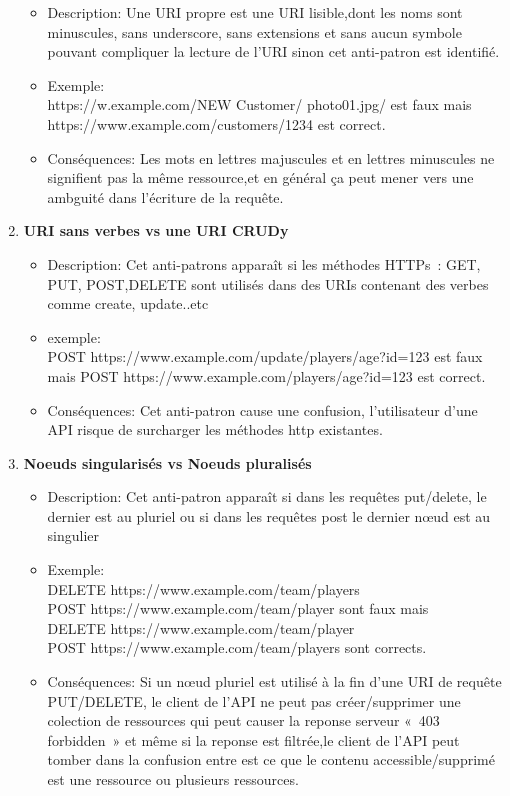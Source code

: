 \begin{enumerate}
\begin{itemize}
\item Description: Une URI propre est une URI lisible,dont les noms sont minuscules, sans underscore, sans extensions et sans aucun symbole pouvant compliquer la lecture de l’URI sinon cet anti-patron est identifié.
\item Exemple:\\
https://w\itemww.example.com/NEW Customer/ photo01.jpg/ est faux mais \\
https://www.example.com/customers/1234 est correct.
\item Conséquences: Les mots en lettres majuscules et en lettres minuscules ne signifient pas la même ressource,et en général ça peut mener vers une ambguité dans l'écriture de la requête.
\end{itemize}
\item \textbf{URI sans verbes vs une URI CRUDy}
\begin{itemize}
    

\item Description: Cet anti-patrons apparaît si les méthodes HTTPs : GET, PUT, POST,DELETE sont utilisés dans des URIs contenant des verbes comme create, update..etc
\item exemple:\\
POST https://www.example.com/update/players/age?id=123 est faux\\
mais POST https://www.example.com/players/age?id=123 est correct.
\item Conséquences:
Cet anti-patron cause une confusion, l’utilisateur d’une API risque de surcharger les méthodes http existantes.
\end{itemize}
\item \textbf{Noeuds singularisés vs Noeuds pluralisés}
\begin{itemize}
    

\item Description: Cet anti-patron apparaît si dans les requêtes put/delete, le dernier est au pluriel ou si dans les requêtes post le dernier nœud est au singulier
\item Exemple:\\
DELETE https://www.example.com/team/players \\
 POST https://www.example.com/team/player sont faux mais \\
DELETE https://www.example.com/team/player \\
 POST https://www.example.com/team/players sont corrects.
\item Conséquences:
Si un nœud pluriel est utilisé à la fin d’une URI de requête PUT/DELETE, le client de l’API ne peut pas créer/supprimer une colection de ressources qui peut causer la reponse serveur « 403 forbidden » et même si la reponse est filtrée,le client de l’API peut tomber dans la confusion entre est ce que le contenu accessible/supprimé est une ressource ou plusieurs ressources.
\end{itemize}
\end{enumerate}
